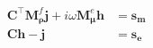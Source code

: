 \begin{equation}
    \begin{split}
        \mathbf{C}^\top \mathbf{M}_{\boldsymbol{\rho}}^f \mathbf{j} + i\omega\mathbf{M}_{\boldsymbol{\mu}}^e\mathbf{h} &= \mathbf{s_m} \\
        \mathbf{C} \mathbf{h} - \mathbf{j} &= \mathbf{s_e}
    \end{split}
    \label{eq:DiscreteFDEMHJ}
\end{equation}
